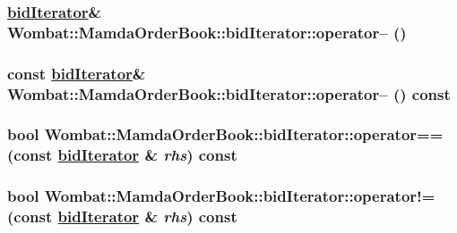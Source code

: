 \hypertarget{classWombat_1_1MamdaOrderBook_1_1bidIterator_3f49dff8e4fbbd44d6e27d712305f756}{
\subsubsection[operator--]{\setlength{\rightskip}{0pt plus 5cm}\hyperlink{classWombat_1_1MamdaOrderBook_1_1bidIterator}{bid\-Iterator}\& Wombat::Mamda\-Order\-Book::bid\-Iterator::operator-- ()}}
\label{classWombat_1_1MamdaOrderBook_1_1bidIterator_3f49dff8e4fbbd44d6e27d712305f756}


\hypertarget{classWombat_1_1MamdaOrderBook_1_1bidIterator_251a11b56200b78030fd94c8da915ceb}{
\subsubsection[operator--]{\setlength{\rightskip}{0pt plus 5cm}const \hyperlink{classWombat_1_1MamdaOrderBook_1_1bidIterator}{bid\-Iterator}\& Wombat::Mamda\-Order\-Book::bid\-Iterator::operator-- () const}}
\label{classWombat_1_1MamdaOrderBook_1_1bidIterator_251a11b56200b78030fd94c8da915ceb}


\hypertarget{classWombat_1_1MamdaOrderBook_1_1bidIterator_c1bcf4b74ee556e20ed659d62e115fe9}{
\subsubsection[operator==]{\setlength{\rightskip}{0pt plus 5cm}bool Wombat::Mamda\-Order\-Book::bid\-Iterator::operator== (const \hyperlink{classWombat_1_1MamdaOrderBook_1_1bidIterator}{bid\-Iterator} \& {\em rhs}) const}}
\label{classWombat_1_1MamdaOrderBook_1_1bidIterator_c1bcf4b74ee556e20ed659d62e115fe9}


\hypertarget{classWombat_1_1MamdaOrderBook_1_1bidIterator_e95f822afd94cc8b6ecea297f165ce3e}{
\subsubsection[operator"!=]{\setlength{\rightskip}{0pt plus 5cm}bool Wombat::Mamda\-Order\-Book::bid\-Iterator::operator!= (const \hyperlink{classWombat_1_1MamdaOrderBook_1_1bidIterator}{bid\-Iterator} \& {\em rhs}) const}}
\label{classWombat_1_1MamdaOrderBook_1_1bidIterator_e95f822afd94cc8b6ecea297f165ce3e}


